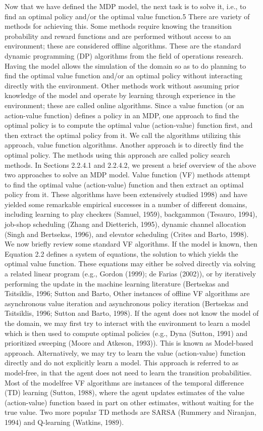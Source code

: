 Now that we have defined the MDP model, the next task is to solve it, i.e., to find an
optimal policy and/or the optimal value function.5 There are variety of methods for achieving
this. Some methods require knowing the transition probability and reward functions
and are performed without access to an environment; these are considered offline algorithms.
These are the standard dynamic programming (DP) algorithms from the field of
operations research. Having the model allows the simulation of the domain so as to do
planning to find the optimal value function and/or an optimal policy without interacting
directly with the environment. Other methods work without assuming prior knowledge of
the model and operate by learning through experience in the environment; these are called
online algorithms.
Since a value function (or an action-value function) defines a policy in an MDP, one
approach to find the optimal policy is to compute the optimal value (action-value) function
first, and then extract the optimal policy from it. We call the algorithms utilizing this approach,
value function algorithms. Another approach is to directly find the optimal policy.
The methods using this approach are called policy search methods. In Sections 2.2.4.1 and
2.2.4.2, we present a brief overview of the above two approaches to solve an MDP model.
Value function (VF) methods attempt to find the optimal value (action-value) function
and then extract an optimal policy from it. These algorithms have been extensively studied
1998) and have yielded some remarkable empirical successes in a number of different domains,
including learning to play checkers (Samuel, 1959), backgammon (Tesauro, 1994),
job-shop scheduling (Zhang and Dietterich, 1995), dynamic channel allocation (Singh and
Bertsekas, 1996), and elevator scheduling (Crites and Barto, 1998). We now briefly review
some standard VF algorithms.
If the model is known, then Equation 2.2 defines a system of equations, the solution to
which yields the optimal value function. These equations may either be solved directly via
solving a related linear program (e.g., Gordon (1999); de Farias (2002)), or by iteratively
performing the update
in the machine learning literature (Bertsekas and Tsitsiklis, 1996; Sutton and Barto,
Other instances of offline VF algorithms are asynchronous value iteration and asynchronous
policy iteration (Bertsekas and Tsitsiklis, 1996; Sutton and Barto, 1998).
If the agent does not know the model of the domain, we may first try to interact with the
environment to learn a model which is then used to compute optimal policies (e.g., Dyna
(Sutton, 1991) and prioritized sweeping (Moore and Atkeson, 1993)). This is known as
Model-based approach. Alternatively, we may try to learn the value (action-value) function
directly and do not explicitly learn a model. This approach is referred to as model-free,
in that the agent does not need to learn the transition probabilities. Most of the modelfree
VF algorithms are instances of the temporal difference (TD) learning (Sutton, 1988),
where the agent updates estimates of the value (action-value) function based in part on
other estimates, without waiting for the true value. Two more popular TD methods are
SARSA (Rummery and Niranjan, 1994) and Q-learning (Watkins, 1989).


